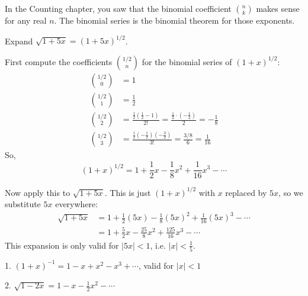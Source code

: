 In the Counting chapter, you saw that the binomial coefficient $\binom{n}{k}$ makes sense for any real
$n$. The binomial series is the binomial theorem for those exponents.

\begin{Worked}
\begin{Problem}
Expand $\sqrt{1+5x} = (1+5x)^{1/2}$.
\end{Problem}
\begin{Solution}
First compute the coefficients $\binom{1/2}{n}$ for the binomial series of $(1+x)^{1/2}$:
\begin{align*}
\binom{1/2}{0} &= 1 \\
\binom{1/2}{1} &= \frac{1}{2} \\
\binom{1/2}{2} &= \frac{\frac{1}{2}\left(\frac{1}{2}-1\right)}{2!} = \frac{\frac{1}{2}\cdot\left(-\frac{1}{2}\right)}{2} = -\frac{1}{8} \\
\binom{1/2}{3} &= \frac{\frac{1}{2}\left(-\frac{1}{2}\right)\left(-\frac{3}{2}\right)}{3!} = \frac{3/8}{6} = \frac{1}{16}
\end{align*}
So,
\begin{equation*}
(1+x)^{1/2} = 1 + \frac{1}{2}x - \frac{1}{8}x^2 + \frac{1}{16}x^3 - \cdots
\end{equation*}

Now apply this to $\sqrt{1+5x}$. This is just $(1+x)^{1/2}$ with $x$ replaced by $5x$, so we substitute $5x$ everywhere:
\begin{align*}
\sqrt{1+5x} &= 1 + \frac{1}{2}(5x) - \frac{1}{8}(5x)^2 + \frac{1}{16}(5x)^3 - \cdots \\
&= 1 + \frac{5}{2}x - \frac{25}{8}x^2 + \frac{125}{16}x^3 - \cdots
\end{align*}
This expansion is only valid for $|5x| < 1$, i.e. $|x| < \frac{1}{5}$.
\end{Solution}
\end{Worked}

\begin{Exercise}[title={Fractional Binomial Expansion}, label=fracbinom]
\end{Exercise}
\begin{Answer}[ref=fracbinom]
  1. $(1+x)^{-1} = 1 - x + x^2 - x^3 + \cdots$, valid for $|x| < 1$

  2. $\sqrt{1-2x} = 1 - x - \frac{1}{2}x^2 - \cdots$
\end{Answer}


